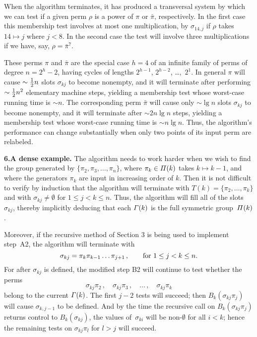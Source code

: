 When the algorithm terminates, it has produced a transversal system
by which we can test if a given perm $\rho$ is a power of $\pi$ or $\bar\pi$,
respectively. In the first case this membership test involves at most one
multiplication, by $\sigma_{14,j}$ if $\rho$ takes $14\mapsto j$ where $j<8$.
In the second case the test will involve three multiplications if we have,
say, $\rho=\bar\pi^7$.

These perms $\pi$ and $\bar\pi$ are the special case $h=4$ of an infinite
family of perms of degree $n=2^h-2$, having cycles of lengths $2^{h-1}$,
$2^{h-2}$, \dots,~$2^1$. In general $\pi$ will cause $\sim{1\over2}n$
slots $\sigma_{kj}$ to become nonempty, and it will terminate after performing
$\sim{1\over2}n^2$ elementary machine steps, yielding a membership
test whose worst-case running time is $\sim n$. The corresponding perm
$\bar\pi$ will cause only $\sim\lg n$ slots $\sigma_{kj}$ to become
nonempty, and it will terminate after $\sim 2n\lg n$ steps,
yielding a membership test whose worst-case running
time is $\sim n\lg n$. Thus, the algorithm's performance can change
substantially when only two points of its input perm are relabeled.

\medskip
\noindent
{\bf 6.\enspace A dense example.}\enspace
 The algorithm needs to work harder when we wish
to find the group generated by $\{\pi_2,\pi_3,\ldots,\pi_n\}$, where
$\pi_k\in{\mit\Pi}(k)$ takes $k\mapsto k-1$, and where the generators $\pi_k$
are input in increasing order of $k$. Then it is not difficult to verify
by induction that the algorithm will terminate with 
$T(k)=\{\pi_2,\ldots,\pi_k\}$
and with $\sigma_{kj}\neq\emptyset$ for $1\leq j<k\leq n$.
 Thus, the algorithm will fill all of the slots $\sigma_{kj}$,
thereby implicitly deducing that each ${\mit\Gamma}(k)$ is the full
symmetric group~${\mit\Pi}(k)$.

Moreover, if the recursive method of Section 3 is being used to
implement step~A2, the algorithm will terminate with
$$\sigma_{kj}=\pi_k\pi_{k-1}\ldots\pi_{j+1}\,,
\qquad\hbox{for $1\le j<k\le n$}.$$
For after $\sigma_{kj}$ is defined, the modified step B2 will continue
to test whether the perms
$$\sigma_{kj}\pi_2\,,\quad \sigma_{kj}\pi_3\,,\quad\ldots\,,\quad
\sigma_{kj}\pi_k$$
belong to the current ${\mit\Gamma}(k)$. The first $j-2$ tests will succeed;
then $B_k(\sigma_{kj}\pi_j)$ will cause $\sigma_{k,j-1}$ to be
defined. And by the time the recursive call on $B_k(\sigma_{kj}\pi_j)$
returns control to $B_k(\sigma_{kj})$, the values of~$\sigma_{ki}$
will be non-$\emptyset$ for all $i<k$; hence the remaining tests on
$\sigma_{kj}\pi_l$ for $l>j$ will succeed.

